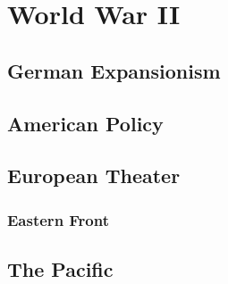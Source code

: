 \chapter{World War II}

\section{German Expansionism}

\section{American Policy}

\section{European Theater}

\subsection*{Eastern Front}

\section{The Pacific}
